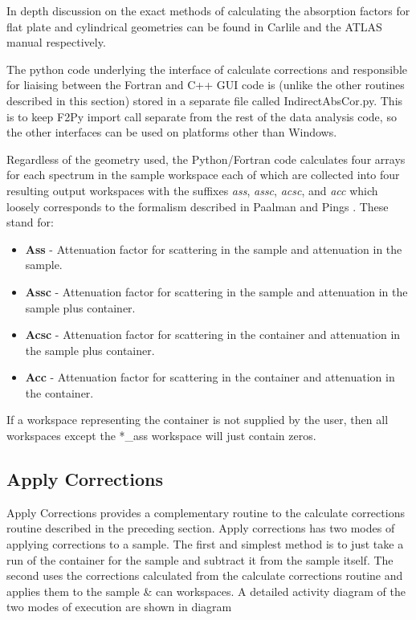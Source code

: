 \documentclass[paper=a4, fontsize=11pt]{scrartcl}	%
\numberwithin{equation}{section}															%
\numberwithin{figure}{section}																%
\numberwithin{table}{section}																%
\begin{document}
In depth discussion on the exact methods of calculating the absorption factors for flat plate and cylindrical geometries can be found in Carlile \cite{ccarlile1974} and the ATLAS manual \cite{aksoper1989} respectively.

The python code underlying the interface of calculate corrections and responsible for liaising between the Fortran and C++ GUI code is (unlike the other routines described in this section) stored in a separate file called IndirectAbsCor.py. This is to keep F2Py import call separate from the rest of the data analysis code, so the other interfaces can be used on platforms other than Windows.

Regardless of the geometry used, the Python/Fortran code calculates four arrays for each spectrum in the sample workspace each of which are collected into four resulting output workspaces with the suffixes \textit{ass}, \textit{assc}, \textit{acsc}, and \textit{acc} which loosely corresponds to the formalism described in Paalman and Pings \cite{hhpaalman1962}. These stand for:

\begin{itemize}
\item \textbf{Ass} - Attenuation factor for scattering in the sample and attenuation in the sample.
\item \textbf{Assc} - Attenuation factor for scattering in the sample and attenuation in the sample plus container.
\item \textbf{Acsc} - Attenuation factor for scattering in the container and attenuation in the sample plus container.
\item \textbf{Acc} - Attenuation factor for scattering in the container and attenuation in the container.
\end{itemize}

If a workspace representing the container is not supplied by the user, then all workspaces except the \**\_ass workspace will just contain zeros.

\subsection{Apply Corrections}
\label{subsubsec:apply-corrections}

Apply Corrections provides a complementary routine to the calculate corrections routine described in the preceding section. Apply corrections has two modes of applying corrections to a sample. The first and simplest method is to just take a run of the container for the sample and subtract it from the sample itself. The second uses the corrections calculated from the calculate corrections routine and applies them to the sample \& can workspaces. A detailed activity diagram of the two modes of execution are shown in diagram
\end{document}

